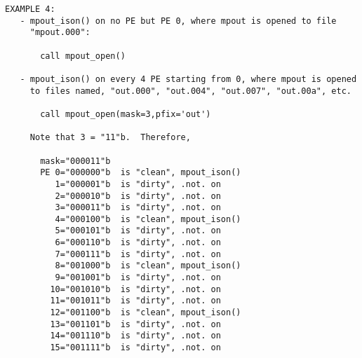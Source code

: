 \begin{verbatim}
EXAMPLE 4:
   - mpout_ison() on no PE but PE 0, where mpout is opened to file
     "mpout.000":

       call mpout_open()

   - mpout_ison() on every 4 PE starting from 0, where mpout is opened
     to files named, "out.000", "out.004", "out.007", "out.00a", etc.

       call mpout_open(mask=3,pfix='out')

     Note that 3 = "11"b.  Therefore,

       mask="000011"b
       PE 0="000000"b  is "clean", mpout_ison()
          1="000001"b  is "dirty", .not. on
          2="000010"b  is "dirty", .not. on
          3="000011"b  is "dirty", .not. on
          4="000100"b  is "clean", mpout_ison()
          5="000101"b  is "dirty", .not. on
          6="000110"b  is "dirty", .not. on
          7="000111"b  is "dirty", .not. on
          8="001000"b  is "clean", mpout_ison()
          9="001001"b  is "dirty", .not. on
         10="001010"b  is "dirty", .not. on
         11="001011"b  is "dirty", .not. on
         12="001100"b  is "clean", mpout_ison()
         13="001101"b  is "dirty", .not. on
         14="001110"b  is "dirty", .not. on
         15="001111"b  is "dirty", .not. on
\end{verbatim}
%
